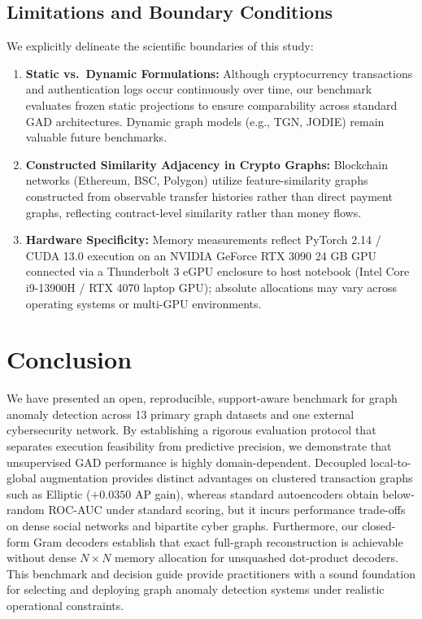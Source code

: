 \documentclass[applsci,article,submit,moreauthors,pdftex]{Definitions/mdpi}
\begin{document}
\subsection{Limitations and Boundary Conditions}
We explicitly delineate the scientific boundaries of this study:
\begin{enumerate}
    \item \textbf{Static vs.\ Dynamic Formulations:} Although cryptocurrency transactions and authentication logs occur continuously over time, our benchmark evaluates frozen static projections to ensure comparability across standard GAD architectures. Dynamic graph models (e.g., TGN, JODIE) remain valuable future benchmarks.
    \item \textbf{Constructed Similarity Adjacency in Crypto Graphs:} Blockchain networks (Ethereum, BSC, Polygon) utilize feature-similarity graphs constructed from observable transfer histories rather than direct payment graphs, reflecting contract-level similarity rather than money flows.
    \item \textbf{Hardware Specificity:} Memory measurements reflect PyTorch 2.14 / CUDA 13.0 execution on an NVIDIA GeForce RTX 3090 24 GB GPU connected via a Thunderbolt 3 eGPU enclosure to host notebook (Intel Core i9-13900H / RTX 4070 laptop GPU); absolute allocations may vary across operating systems or multi-GPU environments.
\end{enumerate}

\section{Conclusion}
\label{sec:conclusion}
We have presented an open, reproducible, support-aware benchmark for graph anomaly detection across 13 primary graph datasets and one external cybersecurity network. By establishing a rigorous evaluation protocol that separates execution feasibility from predictive precision, we demonstrate that unsupervised GAD performance is highly domain-dependent. Decoupled local-to-global augmentation provides distinct advantages on clustered transaction graphs such as Elliptic ($+0.0350$ AP gain), whereas standard autoencoders obtain below-random ROC-AUC under standard scoring, but it incurs performance trade-offs on dense social networks and bipartite cyber graphs. Furthermore, our closed-form Gram decoders establish that exact full-graph reconstruction is achievable without dense $N \times N$ memory allocation for unsquashed dot-product decoders. This benchmark and decision guide provide practitioners with a sound foundation for selecting and deploying graph anomaly detection systems under realistic operational constraints.
\end{document}
